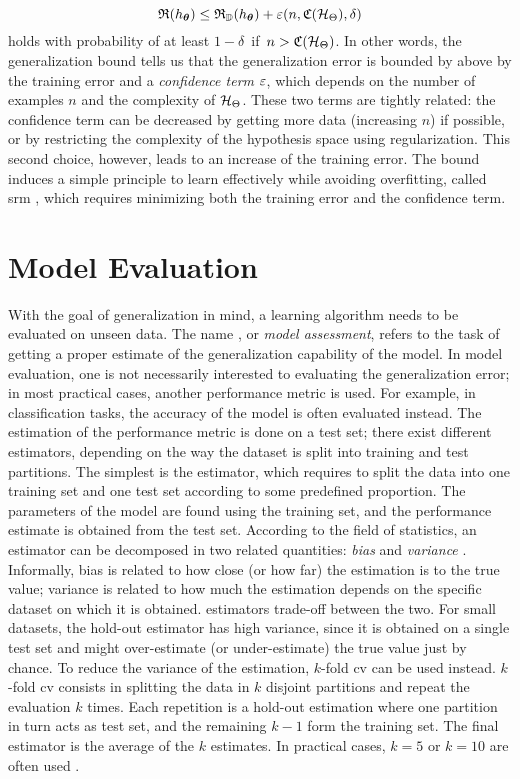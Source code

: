 $$\Risk(h_{\Param}) \leq \Risk_{\Data}(h_{\Param}) + \eps(n, \Complexity(\HSpace), \delta)$$
holds with probability of at least $1 - \delta\,$ if $\,n > \Complexity(\HSpace)$. In other words, the generalization bound tells us that the generalization error is bounded by above by the training error and a \emph{confidence term} $\varepsilon$, which depends on the number of examples $n$ and the complexity of $\HSpace$. These two terms are tightly related: the confidence term can be decreased by getting more data (increasing $n$) if possible, or by restricting the complexity of the hypothesis space using regularization. This second choice, however, leads to an increase of the training error. The bound induces a simple principle to learn effectively while avoiding overfitting, called \gls{srm} \citep{vapnik2000slt}, which requires minimizing both the training error and the confidence term.

\section{Model Evaluation}\label{sec:model-selection}
With the goal of generalization in mind, a learning algorithm needs to be evaluated on unseen data. The name , or \emph{model assessment}, refers to the task of getting a proper estimate of the generalization capability of the model. In model evaluation, one is not necessarily interested to evaluating the generalization error; in most practical cases, another performance metric is used. For example, in classification tasks, the accuracy of the model is often evaluated instead. The estimation of the performance metric is done on a test set; there exist different estimators, depending on the way the dataset is split into training and test partitions. The simplest is the  estimator, which requires to split the data into one training set and one test set according to some predefined proportion. The parameters of the model are found using the training set, and the performance estimate is obtained from the test set. According to the field of statistics, an estimator can be decomposed in two related quantities: \emph{bias} and \emph{variance} \citep{hastie2009elements}. Informally, bias is related to how close (or how far) the estimation is to the true value; variance is related to how much the estimation depends on the specific dataset on which it is obtained.  estimators trade-off between the two. For small datasets, the hold-out estimator has high variance, since it is obtained on a single test set and might over-estimate (or under-estimate) the true value just by chance. To reduce the variance of the estimation, $k$-fold \gls{cv} \citep{arlot2010cv} can be used instead. $k$-fold \gls{cv} consists in splitting the data in $k$ disjoint partitions and repeat the evaluation $k$ times. Each repetition is a hold-out estimation where one partition in turn acts as test set, and the remaining $k-1$ form the training set. The final estimator is the average of the $k$ estimates. In practical cases, $k=5$ or $k=10$ are often used \citep{hastie2009elements,kohavi1995kfold}.


